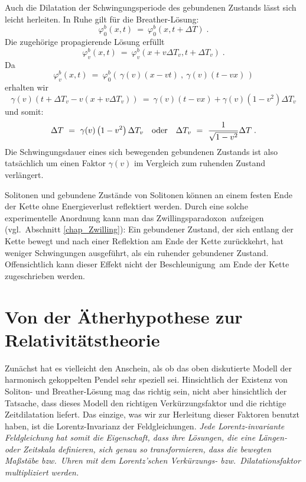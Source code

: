 Auch die Dilatation der Schwingungsperiode des gebundenen Zustands l\"asst
sich leicht herleiten. In Ruhe gilt f\"{u}r die Breather-L\"osung:
\[      \varphi_0^b(x,t) ~=~ \varphi_0^b(x,t+\Delta T) \;. \]
Die zugeh\"orige propagierende L\"osung erf\"ullt
\[   \varphi_v^b(x,t) ~=~ \varphi_v^b(x+v\Delta T_v, t+\Delta T_v) \;. \]
Da
\[   \varphi_v^b(x,t) ~=~
     \varphi_0^b \left(\,\gamma(v)(x-vt)\:,\:\gamma(v)(t-vx)\,\right)  \]
erhalten wir
\[   \gamma(v) \left( t+ \Delta T_v - v
     \left( x + v \Delta T_v \right) \right) ~=~
     \gamma(v) \left(t-v x \right) +
     \gamma(v) \left( 1-v^2\right) \Delta T_v \]
und somit:
\begin{equation}
\label{dilation}
      \Delta T ~=~ \gamma(v) \left(1-v^2 \right) \Delta T_v
      ~~~{\rm oder}~~~
      \Delta T_v ~=~ \frac{1}{\sqrt{1-v^2}} \Delta T \;.
\end{equation}
Die Schwingungsdauer eines sich bewegenden gebundenen Zustands ist
also tats\"achlich um einen Faktor $\gamma(v)$ im Vergleich zum ruhenden
Zustand verl\"angert.

Solitonen und gebundene Zust\"{a}nde von Solitonen k\"onnen an einem
festen Ende der Kette ohne Energieverlust reflektiert werden. Durch
eine solche experimentelle Anordnung kann man das 
\glqq Zwillingsparadoxon\grqq\ aufzeigen (vgl.\ Abschnitt \ref{chap_Zwilling}): 
Ein gebundener Zustand, der
sich entlang der Kette bewegt und nach einer Reflektion am Ende
der Kette zur\"uckkehrt, hat weniger Schwingungen ausgef\"uhrt, als ein
ruhender gebundener Zustand. Offensichtlich kann dieser Effekt
nicht der \glqq Beschleunigung\grqq\ am Ende der Kette
zugeschrieben werden.

\section{Von der \"Atherhypothese zur Relativit\"atstheorie}

Zun\"achst hat es vielleicht den Anschein, als ob das oben diskutierte
Modell der harmonisch gekoppelten Pendel sehr speziell sei. 
Hinsichtlich der Existenz von Soliton- und Breather-L\"osung mag das
richtig sein, nicht aber hinsichtlich der Tatsache, dass
dieses Modell den richtigen Verk\"urzungsfaktor und die richtige
Zeitdilatation liefert. Das einzige, was wir zur Herleitung dieser
Faktoren benutzt haben, ist die Lorentz-Invarianz der Feldgleichungen.
{\em Jede Lorentz-invariante Feldgleichung hat somit die Eigenschaft, dass
ihre L\"osungen, die eine L\"angen- oder Zeitskala definieren, sich genau
so transformieren, dass die bewegten Ma\ss st\"abe bzw.\ Uhren 
mit dem Lorentz'schen Verk\"urzungs- bzw.\ Dilatationsfaktor
multipliziert werden.}

